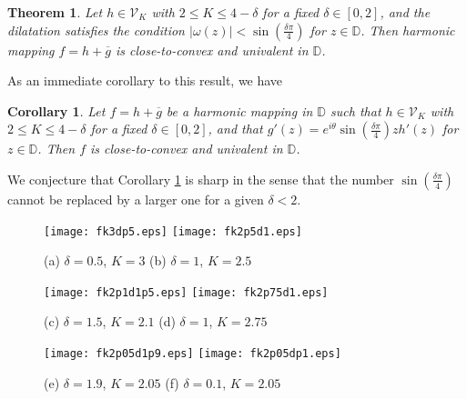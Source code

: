 \documentclass[a4paper,12pt]{amsart}
\newtheorem{thm}{Theorem}
\newtheorem{cor}{Corollary}
\theoremstyle{definition}
\begin{document}
\begin{thm}\label{AP-Theorem4}
Let $h\in {\mathcal V}_{K}$ with $2\leq K\leq 4-\delta $ for a fixed $\delta \in [0,2]$, and the dilatation satisfies the
condition $|\omega (z)|<\sin (\frac{\delta \pi }{4})$ for $z\in{{\mathbb D}}$. Then harmonic mapping $f=h+\overline{g}$ is
close-to-convex and univalent in ${{\mathbb D}}$.
\end{thm}

As an immediate corollary to this result, we have

\begin{cor} \label{AP-Cor2}
Let $f=h+\overline{g}$ be a harmonic mapping in ${{\mathbb D}}$ such that $h\in {\mathcal V}_{K}$ with $2\leq K\leq 4-\delta $ for a fixed $\delta \in [0,2]$,
and that $g'(z)=e^{i\theta }\sin (\frac{\delta \pi }{4})z h'(z)$ for $z\in{{\mathbb D}}$. Then $f$ is close-to-convex and univalent in ${{\mathbb D}}$.
\end{cor}

We conjecture that Corollary \ref{AP-Cor2} is sharp in the sense that the number $\sin (\frac{\delta \pi }{4})$ cannot be replaced by
a larger one for a given $\delta <2$.

\begin{figure}
\begin{center}
\texttt{[image: fk3dp5.eps]}
\hspace{1cm}
\texttt{[image: fk2p5d1.eps]}
\end{center}
(a) $\delta = 0.5$, $K = 3$ \hspace{5cm} (b) $\delta = 1 $, $K= 2.5$
\vspace{0.5cm}

\begin{center}
\texttt{[image: fk2p1d1p5.eps]}
\hspace{1cm}
\texttt{[image: fk2p75d1.eps]}
\end{center}
(c) $\delta = 1.5$, $K =2.1 $ \hspace{5cm} (d) $\delta = 1$, $K =2.75 $

\begin{center}
\texttt{[image: fk2p05d1p9.eps]}
\hspace{1cm}
\texttt{[image: fk2p05dp1.eps]}
\end{center}
(e) $\delta = 1.9$, $K = 2.05$ \hspace{5cm} (f) $\delta = 0.1 $, $K = 2.05 $
\vspace{0.1cm}
\end{figure}
\end{document}
